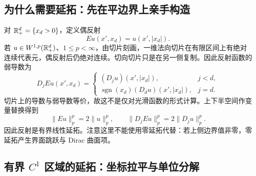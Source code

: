 \subsection{为什么需要延拓：先在平边界上亲手构造}

对 $\mathbb R^d_+=\{x_d>0\}$，定义偶反射
\[
 Eu(x',x_d)=u(x',|x_d|).
\]
若 $u\in W^{1,p}(\mathbb R^d_+)$、$1\le p<\infty$，由切片刻画，一维法向切片在有限区间上有绝对连续代表元，偶反射后仍绝对连续。切向切片只是在另一侧复制。因此反射函数的弱导数为
\begin{equation}
 D_jEu(x',x_d)=
 \begin{cases}(D_ju)(x',|x_d|),&j<d,\\
 \operatorname{sgn}(x_d)(D_du)(x',|x_d|),&j=d.
 \end{cases}
 \label{eq:weak-reflection}
\end{equation}
切片上的导数与弱导数等价，故这不是仅对光滑函数的形式计算。上下半空间作变量替换得到
\[
 \|Eu\|_p^p=2\|u\|_p^p,\qquad
 \|D_jEu\|_p^p=2\|D_ju\|_p^p.
\]
因此反射是有界线性延拓。注意这里不能使用零延拓代替：若上侧边界值非零，零延拓产生界面跳跃与 Dirac 曲面项。

\subsection{有界 \texorpdfstring{$C^1$}{C1} 区域的延拓：坐标拉平与单位分解}\label{subsec:weak-extension}

